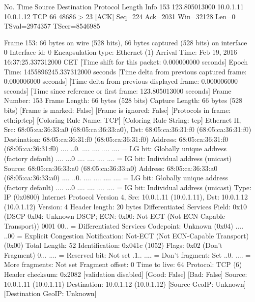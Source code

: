 No.     Time           Source                Destination           Protocol Length Info
    153 123.805013000  10.0.1.11             10.0.1.12             TCP      66     48686 > 23 [ACK] Seq=224 Ack=2031 Win=32128 Len=0 TSval=2974357 TSecr=8546985

Frame 153: 66 bytes on wire (528 bits), 66 bytes captured (528 bits) on interface 0
    Interface id: 0
    Encapsulation type: Ethernet (1)
    Arrival Time: Feb 19, 2016 16:37:25.337312000 CET
    [Time shift for this packet: 0.000000000 seconds]
    Epoch Time: 1455896245.337312000 seconds
    [Time delta from previous captured frame: 0.000006000 seconds]
    [Time delta from previous displayed frame: 0.000006000 seconds]
    [Time since reference or first frame: 123.805013000 seconds]
    Frame Number: 153
    Frame Length: 66 bytes (528 bits)
    Capture Length: 66 bytes (528 bits)
    [Frame is marked: False]
    [Frame is ignored: False]
    [Protocols in frame: eth:ip:tcp]
    [Coloring Rule Name: TCP]
    [Coloring Rule String: tcp]
Ethernet II, Src: 68:05:ca:36:33:a0 (68:05:ca:36:33:a0), Dst: 68:05:ca:36:31:f0 (68:05:ca:36:31:f0)
    Destination: 68:05:ca:36:31:f0 (68:05:ca:36:31:f0)
        Address: 68:05:ca:36:31:f0 (68:05:ca:36:31:f0)
        .... ..0. .... .... .... .... = LG bit: Globally unique address (factory default)
        .... ...0 .... .... .... .... = IG bit: Individual address (unicast)
    Source: 68:05:ca:36:33:a0 (68:05:ca:36:33:a0)
        Address: 68:05:ca:36:33:a0 (68:05:ca:36:33:a0)
        .... ..0. .... .... .... .... = LG bit: Globally unique address (factory default)
        .... ...0 .... .... .... .... = IG bit: Individual address (unicast)
    Type: IP (0x0800)
Internet Protocol Version 4, Src: 10.0.1.11 (10.0.1.11), Dst: 10.0.1.12 (10.0.1.12)
    Version: 4
    Header length: 20 bytes
    Differentiated Services Field: 0x10 (DSCP 0x04: Unknown DSCP; ECN: 0x00: Not-ECT (Not ECN-Capable Transport))
        0001 00.. = Differentiated Services Codepoint: Unknown (0x04)
        .... ..00 = Explicit Congestion Notification: Not-ECT (Not ECN-Capable Transport) (0x00)
    Total Length: 52
    Identification: 0x041c (1052)
    Flags: 0x02 (Don't Fragment)
        0... .... = Reserved bit: Not set
        .1.. .... = Don't fragment: Set
        ..0. .... = More fragments: Not set
    Fragment offset: 0
    Time to live: 64
    Protocol: TCP (6)
    Header checksum: 0x2082 [validation disabled]
        [Good: False]
        [Bad: False]
    Source: 10.0.1.11 (10.0.1.11)
    Destination: 10.0.1.12 (10.0.1.12)
    [Source GeoIP: Unknown]
    [Destination GeoIP: Unknown]
